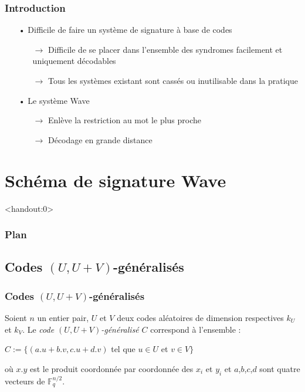 \documentclass[10pt,a4paper]{beamer}
\theoremstyle{plain}
\theoremstyle{definition}
\newcommand{\F}{\mathbb{F}}
\begin{document}
\begin{frame}
\frametitle{Introduction}
\begin{itemize}    
\item[•] Difficile de faire un système de signature à base de codes 
       \begin{itemize}
       \item[$\rightarrow$] Difficile de se placer dans l'ensemble des syndromes facilement et \\uniquement décodables
       \item[$\rightarrow$] Tous les systèmes existant sont cassés ou inutilisable dans la pratique
       \end{itemize}
\vspace{0.2in}
\item[•] Le système Wave
       \begin{itemize}
       \item[$\rightarrow$] Enlève la restriction au mot le plus proche
       \item[$\rightarrow$] Décodage en grande distance
       \end{itemize}
\end{itemize}   

\end{frame}

\section{Schéma de signature Wave}
\begin{frame}<handout:0>
  \frametitle{Plan}
  \tableofcontents[currentsection,subsectionstyle=hide]
\end{frame}

\subsection{Codes $(U,U+V)$-généralisés}

\begin{frame}
\frametitle{Codes $(U,U+V)$-généralisés} 

\noindent Soient $n$ un entier pair, $U$ et $V$ deux codes aléatoires de dimension respectives $k_U$ et $k_V$. Le \textit{code $(U,U+V)$-généralisé } $C$ correspond à l'ensemble :
\vspace{0.1in}
\begin{center}
$C := \{(a.u + b.v, c.u + d.v)$ tel que $u \in U$ et $v \in V \}$
\end{center}
\vspace{0.1in}
où $x.y$ est le produit coordonnée par coordonnée des $x_i$ et $y_i$ et $a$,$b$,$c$,$d$ sont quatre vecteurs de $\F_q^{n/2}$.\\
\end{frame}
\end{document}
